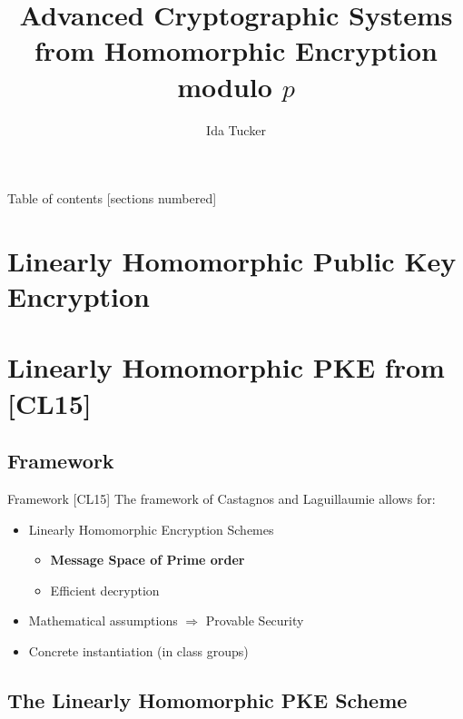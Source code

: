 \documentclass[10pt]{beamer}
\title{Advanced Cryptographic Systems\\ 
from Homomorphic Encryption modulo \texorpdfstring{$p$}{p}}
\date{}
\author{Ida Tucker\inst{}}
\institute{\inst{}Guilhem Castagnos \& Fabien Laguillaumie
}
\begin{document}
\maketitle

\begin{frame}{Table of contents}
  [sections numbered]
  \tableofcontents[hideallsubsections]
\end{frame}

\section{Linearly Homomorphic Public Key Encryption}



\section{Linearly Homomorphic PKE from [CL15]}
\subsection{Framework}
\begin{frame}{Framework [CL15]}
The framework of Castagnos and Laguillaumie allows for:
\begin{itemize}
\item Linearly Homomorphic Encryption Schemes
\begin{itemize}
\item \textbf{Message Space of Prime order}
\item Efficient decryption
\end{itemize}
\item Mathematical assumptions $\Rightarrow$ Provable Security
\item Concrete instantiation (in class groups)
\end{itemize}
\end{frame}





\subsection{The Linearly Homomorphic PKE Scheme}




\end{document}
